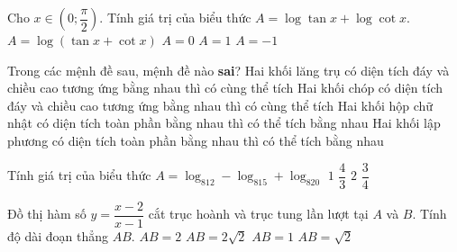 \begin{ex}%
	Cho $x\in \left(0; \dfrac{\pi}{2}\right)$. Tính giá trị của biểu thức $A=\log\tan x+\log\cot x$.
	\choice
	{$A=\log\left(\tan x+\cot x\right)$}
	{\True $A=0$}
	{$A=1$}
	{$A=-1$}
\end{ex}

\begin{ex}%
	Trong các mệnh đề sau, mệnh đề nào \textbf{sai}?
	\choice
	{Hai khối lăng trụ có diện tích đáy và chiều cao tương ứng bằng nhau thì có cùng thể tích}
	{Hai khối chóp có diện tích đáy và chiều cao tương ứng bằng nhau thì có cùng thể tích}
	{\True Hai khối hộp chữ nhật có diện tích toàn phần bằng nhau thì có thể tích bằng nhau}
	{Hai khối lập phương có diện tích toàn phần bằng nhau thì có thể tích bằng nhau}
\end{ex}


\begin{ex}%
	Tính giá trị của biểu thức $A=\log_812-\log_815+\log_820$
	\choice
	{$1$}
	{\True $\dfrac{4}{3}$}
	{$2$}
	{$\dfrac{3}{4}$}
\end{ex}


\begin{ex}%
	Đồ thị hàm số $y=\dfrac{x-2}{x-1}$ cắt trục hoành và trục tung lần lượt tại $A$ và $B$. Tính độ dài đoạn thẳng $AB$.
	\choice
	{$AB=2$}
	{\True $AB=2\sqrt{2}$}
	{$AB=1$}
	{$AB=\sqrt{2}$}
\end{ex}


